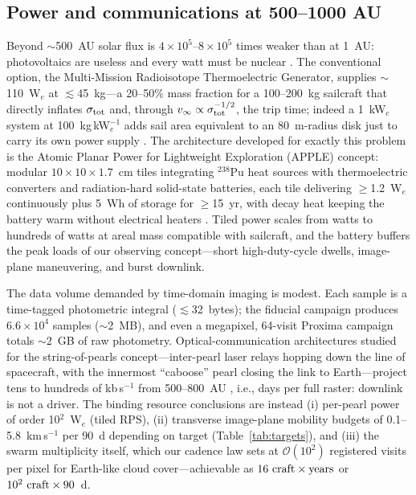 ﻿\documentclass[twocolumn]{emulateapj}
\begin{document}
\subsection{Power and communications at 500--1000 AU}
\label{sec:power}

Beyond $\sim$500~AU solar flux is $4\times10^5$--$8\times10^5$ times
weaker than at 1~AU: photovoltaics are useless and every watt must be
nuclear \citep{tur26prop}. The conventional option, the Multi-Mission
Radioisotope Thermoelectric Generator, supplies $\sim$110~W$_e$ at
$\lesssim$45~kg---a 20--50\% mass fraction for a 100--200~kg sailcraft
that directly inflates $\sigma_{\rm tot}$ and, through
$v_\infty\propto\sigma_{\rm tot}^{-1/2}$, the trip time; indeed a 1~kW$_e$
system at 100~kg\,kW$_e^{-1}$ adds sail area equivalent to an 80~m-radius
disk just to carry its own power supply \citep{tur26prop}. The
architecture developed for exactly this problem is the Atomic Planar
Power for Lightweight Exploration (APPLE) concept: modular
$10\times10\times1.7$~cm tiles integrating $^{238}$Pu heat sources with
thermoelectric converters and radiation-hard solid-state batteries,
each tile delivering $\ge$1.2~W$_e$ continuously plus 5~Wh of storage
for $\ge$15~yr, with decay heat keeping the battery warm without
electrical heaters \citep{apple22,niac20}. Tiled power scales from watts
to hundreds of watts at areal mass compatible with sailcraft, and the
battery buffers the peak loads of our observing concept---short
high-duty-cycle dwells, image-plane maneuvering, and burst downlink.

The data volume demanded by time-domain imaging is modest. Each sample
is a time-tagged photometric integral ($\lesssim$32~bytes); the fiducial
campaign produces $6.6\times10^4$ samples ($\sim$2~MB), and even a
megapixel, 64-visit Proxima campaign totals $\sim$2~GB of raw
photometry. Optical-communication architectures studied for the
string-of-pearls concept---inter-pearl laser relays hopping down the
line of spacecraft, with the innermost ``caboose'' pearl closing the
link to Earth---project tens to hundreds of kb\,s$^{-1}$ from
500--800~AU \citep{helvajian23}, i.e., days per full raster: downlink
is not a driver. The binding resource conclusions are instead (i)
per-pearl power of order 10$^2$~W$_e$ (tiled RPS), (ii) transverse
image-plane mobility budgets of 0.1--5.8~km\,s$^{-1}$ per 90~d depending
on target (Table~\ref{tab:targets}), and (iii) the swarm multiplicity
itself, which our cadence law sets at $\mathcal{O}(10^2)$ registered
visits per pixel for Earth-like cloud cover---achievable as
$16\ {\rm craft}\times{\rm years}$ or $10^2\ {\rm craft}\times90$~d.
\end{document}
